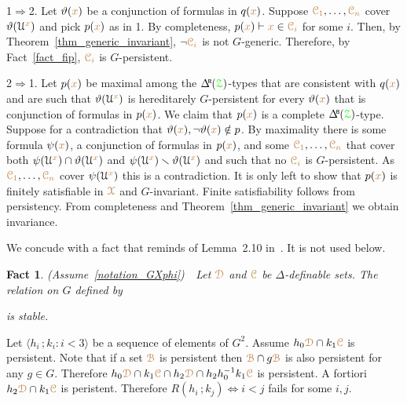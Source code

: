 \documentclass[10pt,openany]{amsproc}
\makeatletter
\def\proves{\vdash}
\def\BDelta{\smash{\Delta\hskip-.4ex\raisebox{.8ex}{\tiny\sf B}}}
\def\IMP{\Rightarrow}
\def\IFF{\Leftrightarrow}
\def\D{\EuScript D}
\def\X{\EuScript X}
\def\Z{\EuScript Z}
\def\C{\EuScript C}
\def\U{\EuScript U}
\def\B{\EuScript B}
\def\<{\langle}
\def\>{\rangle}
\def\theta{\vartheta}
\def\ssf#1{\textsf{\small #1}}
\newcounter{thm}
\theoremstyle{mio}
\newtheorem{fact}[thm]{Fact}\tcolorboxenvironment{fact}{mythm}
\providecommand{\proofNameStyle}{\bfseries}
\renewenvironment{proof}[1][\proofname]{\par
  \pushQED{\qed}%
  \normalfont%
  \trivlist
  \item[\hskip\labelsep
        \proofNameStyle
    #1\@addpunct{.}]\ignorespaces
}{%
  \popQED\endtrivlist\@endpefalse
}
\def\mr{\color{brown}}
\def\gr{\color{green}}
\def\mrB{{\mr\B}}
\def\mrC{{\mr\C}}
\def\mrD{{\mr\D}}
\def\mrX{{\mr\X}}
\def\grZ{{\gr\Z}}
\makeatother
\begin{document}
\begin{proof}
  \ssf1$\IMP$\ssf2.
  Let $\theta({\mr x})$ be a conjunction of formulas in $q({\mr x})$.
  Suppose ${\mr\C_1},\dots,{\mr\C_n}$ cover $\theta(\U^{\mr x})$ and pick $p({\mr x})$ as in \ssf1.
  By completeness, $p({\mr x})\proves {\mr x}\in{\mr\C_i}$ for some $i$.
  Then, by Theorem~\ref{thm_generic_invariant}, $\neg{\mr\C_i}$ is not $G$-generic.
  Therefore, by Fact~\ref{fact_fip}, ${\mr\C_i}$ is $G$-persistent.

  \ssf2$\IMP$\ssf1.
  Let $p({\mr x})$ be maximal among the $\BDelta({\grZ})$-types that are consistent with $q({\mr x})$ and are such that $\theta(\U^{\mr x})$ is hereditarely $G$-persistent for every $\theta({\mr x})$ that is conjunction of formulas in $p({\mr x})$.
  We claim that $p({\mr x})$ is a complete $\BDelta({\grZ})$-type.
  Suppose for a contradiction that $\theta({\mr x}),\neg\theta({\mr x})\notin p$.
  By maximality there is some formula $\psi({\mr x})$, a conjunction of formulas in $p({\mr x})$, and some ${\mr\C_1},\dots,{\mr\C_n}$ that cover both $\psi(\U^{\mr x})\cap\theta(\U^{\mr x})$ and $\psi(\U^{\mr x})\smallsetminus\theta(\U^{\mr x})$ and such that no ${\mr\C_i}$ is $G$-persistent.
  As ${\mr\C_1},\dots,{\mr\C_n}$ cover $\psi(\U^{\mr x})$ this is a contradiction.
  It is only left to show that $p({\mr x})$ is finitely satisfiable in $\mrX$ and $G$-invariant.
  Finite satisfiability follows from persistency.
  From completeness and Theorem~\ref{thm_generic_invariant} we obtain invariance.
\end{proof}

We concude with a fact that reminds of Lemma~2.10 in~\cite{Hr}.
It is not used below.

\begin{fact}
  (Assume~\ref{notation_GXphi})\ \ 
  Let $\mrD$ and $\mrC$ be $\Delta$-definable sets.
  The relation on $G$ defined by
  
  \ceq{\hfill R(h\,;k)}{\IFF}{h\,\mrD\cap k\,\mrC\textrm{ is persistent }}
  
  is stable.
\end{fact}

\begin{proof}
  Let $\<h_i\,;k_i :i<3\>$ be a sequence of elements of $G^2$.
  Assume $h_0\mrD\cap k_1\mrC$ is persistent.
  Note that if a set $\mrB$ is persistent then $\mrB\cap g\mrB$ is also persistent for any $g\in G$.
  Therefore $h_0\mrD\cap k_1\mrC\cap h_2\mrD\cap h_2h_0^{-1}k_1\mrC$ is persistent.
  A fortiori $h_2\mrD\cap k_1\mrC$ is peristent.
  Therefore $R(h_i\,;k_j)\IFF i<j$ fails for some $i,j$.
\end{proof}
\end{document}
